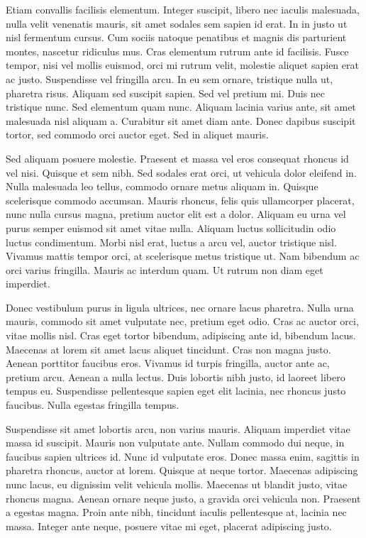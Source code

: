 \documentclass[2pt,a4paper,twoside ]{article}
\begin{document}
\begin{multicols}{2}
Etiam convallis facilisis elementum. Integer suscipit, libero nec iaculis malesuada, nulla velit venenatis mauris, sit amet sodales sem sapien id erat. In in justo ut nisl fermentum cursus. Cum sociis natoque penatibus et magnis dis parturient montes, nascetur ridiculus mus. Cras elementum rutrum ante id facilisis. Fusce tempor, nisi vel mollis euismod, orci mi rutrum velit, molestie aliquet sapien erat ac justo. Suspendisse vel fringilla arcu. In eu sem ornare, tristique nulla ut, pharetra risus. Aliquam sed suscipit sapien. Sed vel pretium mi. Duis nec tristique nunc. Sed elementum quam nunc. Aliquam lacinia varius ante, sit amet malesuada nisl aliquam a. Curabitur sit amet diam ante. Donec dapibus suscipit tortor, sed commodo orci auctor eget. Sed in aliquet mauris.

Sed aliquam posuere molestie. Praesent et massa vel eros consequat rhoncus id vel nisi. Quisque et sem nibh. Sed sodales erat orci, ut vehicula dolor eleifend in. Nulla malesuada leo tellus, commodo ornare metus aliquam in. Quisque scelerisque commodo accumsan. Mauris rhoncus, felis quis ullamcorper placerat, nunc nulla cursus magna, pretium auctor elit est a dolor. Aliquam eu urna vel purus semper euismod sit amet vitae nulla. Aliquam luctus sollicitudin odio luctus condimentum. Morbi nisl erat, luctus a arcu vel, auctor tristique nisl. Vivamus mattis tempor orci, at scelerisque metus tristique ut. Nam bibendum ac orci varius fringilla. Mauris ac interdum quam. Ut rutrum non diam eget imperdiet.

Donec vestibulum purus in ligula ultrices, nec ornare lacus pharetra. Nulla urna mauris, commodo sit amet vulputate nec, pretium eget odio. Cras ac auctor orci, vitae mollis nisl. Cras eget tortor bibendum, adipiscing ante id, bibendum lacus. Maecenas at lorem sit amet lacus aliquet tincidunt. Cras non magna justo. Aenean porttitor faucibus eros. Vivamus id turpis fringilla, auctor ante ac, pretium arcu. Aenean a nulla lectus. Duis lobortis nibh justo, id laoreet libero tempus eu. Suspendisse pellentesque sapien eget elit lacinia, nec rhoncus justo faucibus. Nulla egestas fringilla tempus.

Suspendisse sit amet lobortis arcu, non varius mauris. Aliquam imperdiet vitae massa id suscipit. Mauris non vulputate ante. Nullam commodo dui neque, in faucibus sapien ultrices id. Nunc id vulputate eros. Donec massa enim, sagittis in pharetra rhoncus, auctor at lorem. Quisque at neque tortor. Maecenas adipiscing nunc lacus, eu dignissim velit vehicula mollis. Maecenas ut blandit justo, vitae rhoncus magna. Aenean ornare neque justo, a gravida orci vehicula non. Praesent a egestas magna. Proin ante nibh, tincidunt iaculis pellentesque at, lacinia nec massa. Integer ante neque, posuere vitae mi eget, placerat adipiscing justo.


\end{multicols}
\end{document}
